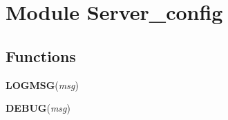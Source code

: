 %
%
%


\section{Module Server\_config}

    \label{Server_config}


  \subsection{Functions}

    \label{Server_config:LOGMSG}

    \vspace{0.5ex}

\hspace{.8\funcindent}\begin{boxedminipage}{\funcwidth}

    \raggedright \textbf{LOGMSG}(\textit{msg})

\setlength{\parskip}{2ex}
\setlength{\parskip}{1ex}
    \end{boxedminipage}

    \label{Server_config:DEBUG}

    \vspace{0.5ex}

\hspace{.8\funcindent}\begin{boxedminipage}{\funcwidth}

    \raggedright \textbf{DEBUG}(\textit{msg})

\setlength{\parskip}{2ex}
\setlength{\parskip}{1ex}
    \end{boxedminipage}


